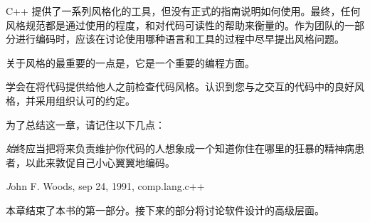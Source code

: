 C++ 提供了一系列风格化的工具，但没有正式的指南说明如何使用。最终，任何风格规范都是通过使用的程度，和对代码可读性的帮助来衡量的。作为团队的一部分进行编码时，应该在讨论使用哪种语言和工具的过程中尽早提出风格问题。

关于风格的最重要的一点是，它是一个重要的编程方面。

学会在将代码提供给他人之前检查代码风格。认识到您与之交互的代码中的良好风格，并采用组织认可的约定。

为了总结这一章，请记住以下几点：

\begin{center}
\textit
始终应当把将来负责维护你代码的人想象成一个知道你住在哪里的狂暴的精神病患者，以此来敦促自己小心翼翼地编码。
\end{center}

\begin{flushright}
\textit
John F. Woods, sep 24, 1991, comp.lang.c++
\end{flushright}

本章结束了本书的第一部分。接下来的部分将讨论软件设计的高级层面。
